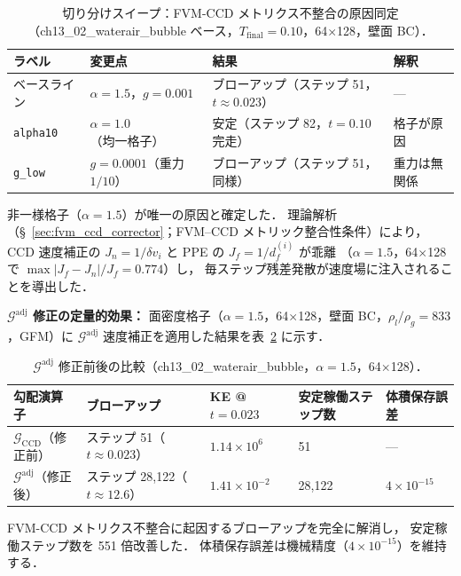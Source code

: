 \begin{table}[htbp]
\centering
\caption{切り分けスイープ：FVM-CCD メトリクス不整合の原因同定
（ch13\_02\_waterair\_bubble ベース，$T_\text{final}=0.10$，64$\times$128，壁面 BC）．}
\label{tab:gadjacent_bisect}
\renewcommand{\arraystretch}{1.3}
\begin{tabular}{llll}
\toprule
ラベル & 変更点 & 結果 & 解釈 \\
\midrule
ベースライン & $\alpha=1.5$，$g=0.001$ & ブローアップ（ステップ 51，$t\approx0.023$） & — \\
\texttt{alpha10} & $\alpha=1.0$（均一格子） & 安定（ステップ 82，$t=0.10$ 完走） & 格子が原因 \\
\texttt{g\_low} & $g=0.0001$（重力 $1/10$） & ブローアップ（ステップ 51，同様） & 重力は無関係 \\
\bottomrule
\end{tabular}
\end{table}

非一様格子（$\alpha=1.5$）が唯一の原因と確定した．
理論解析（§~\ref{sec:fvm_ccd_corrector}；FVM--CCD メトリック整合性条件）により，
CCD 速度補正の $J_n = 1/\delta v_i$ と PPE の $J_f = 1/d_f^{(i)}$ が乖離
（$\alpha=1.5$，64$\times$128 で $\max|J_f - J_n|/J_f = 0.774$）し，
毎ステップ残差発散が速度場に注入されることを導出した．

\noindent\textbf{$\mathcal{G}^\text{adj}$ 修正の定量的効果：}
面密度格子（$\alpha=1.5$，64$\times$128，壁面 BC，$\rho_l/\rho_g = 833$，GFM）に
$\mathcal{G}^\text{adj}$ 速度補正を適用した結果を表~\ref{tab:gadjacent_result} に示す．

\begin{table}[htbp]
\centering
\caption{$\mathcal{G}^\text{adj}$ 修正前後の比較（ch13\_02\_waterair\_bubble，$\alpha=1.5$，64$\times$128）．}
\label{tab:gadjacent_result}
\renewcommand{\arraystretch}{1.3}
\begin{tabular}{lllll}
\toprule
勾配演算子 & ブローアップ & KE @ $t=0.023$ & 安定稼働ステップ数 & 体積保存誤差 \\
\midrule
$\mathcal{G}_\text{CCD}$（修正前） & ステップ 51（$t\approx0.023$） & $1.14\times10^{6}$ & 51 & — \\
$\mathcal{G}^\text{adj}$（修正後） & ステップ 28{,}122（$t\approx12.6$） & $1.41\times10^{-2}$ & 28{,}122 & $4\times10^{-15}$ \\
\bottomrule
\end{tabular}
\end{table}

FVM-CCD メトリクス不整合に起因するブローアップを完全に解消し，
安定稼働ステップ数を 551 倍改善した．
体積保存誤差は機械精度（$4\times10^{-15}$）を維持する．


